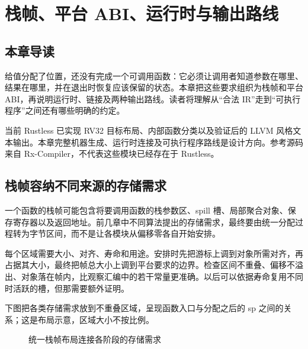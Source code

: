 \chapter{栈帧、平台 ABI、运行时与输出路线}
\label{chap:backend-routes}
\section*{本章导读}
给值分配了位置，还没有完成一个可调用函数：它必须让调用者知道参数在哪里、结果在哪里，并在退出时恢复应该保留的状态。本章把这些要求组织为栈帧和平台 ABI，再说明运行时、链接及两种输出路线。读者将理解从“合法 IR”走到“可执行程序”之间还有哪些明确的约定。

当前 Rustless 已实现 RV32 目标布局、内部函数分类以及验证后的 LLVM 风格文本输出。本章完整机器生成、运行时连接及可执行程序路线是设计方向。参考源码来自 Rx-Compiler，不代表这些模块已经存在于 Rustless。

\section{栈帧容纳不同来源的存储需求}
一个函数的栈帧可能包含将要调用函数的栈参数区、spill 槽、局部聚合对象、保存寄存器以及返回地址。前几章中不同算法提出的存储需求，最终要由统一分配过程转为字节区间，而不是让各模块从偏移零各自开始安排。

每个区域需要大小、对齐、寿命和用途。安排时先把游标上调到对象所需对齐，再占据其大小，最终把帧总大小上调到平台要求的边界。检查区间不重叠、偏移不溢出、对象落在帧内，比观察汇编中的若干常量更准确。以后可以依据寿命复用不同时活跃的槽，但那需要额外证明。

下图把各类存储需求放到不重叠区域，呈现函数入口与分配之后的 sp 之间的关系；这是布局示意，区域大小不按比例。
\begin{figure}[htbp]\centering
{}
\caption{统一栈帧布局连接各阶段的存储需求}
\end{figure}

